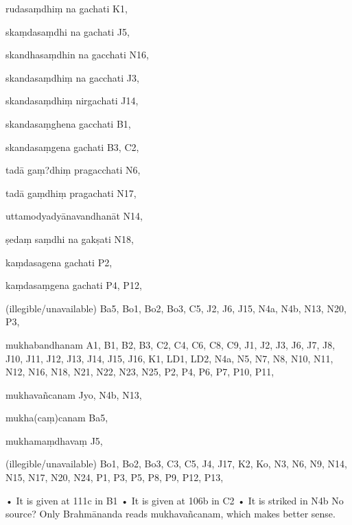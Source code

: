 \begin{marma}[hp03_065]
\item[rudasaṃdhiṃ na gachati] K1,
\item[skaṃdasaṃdhi na gachati] J5,
\item[skandhasaṃdhin na gacchati] N16,
\item[skandasaṃdhiṃ na gacchati] J3,
\item[skandasaṃdhiṃ nirgachati] J14,
\item[skandasaṃghena gacchati] B1,  
\item[skandasaṃgena gachati] B3, C2, 
\item[tadā gaṃ?dhiṃ pragacchati] N6,
\item[tadā gaṃdhiṃ pragachati] N17,
\item[uttamodyadyānavandhanāt] N14,
\item[ṣedaṃ saṃdhi na gakṣati] N18,
\item[kaṃdasagena gachati] P2,
\item[kaṃdasaṃgena gachati] P4, P12, 
\item[(illegible/unavailable)] Ba5, Bo1, Bo2, Bo3, C5, J2, J6, J15, N4a, N4b, N13, N20, P3,

  \begin{description}
  \end{description}

\end{marma}

\begin{marma}[hp03_076]


\item[mukhabandhanam] A1, B1, B2, B3, C2, C4, C6, C8, C9, J1, J2, J3, J6, J7, J8, J10, J11, J12, J13, J14, J15, J16, K1, LD1, LD2, N4a, N5, N7, N8, N10, N11, N12, N16, N18, N21, N22, N23, N25, P2, P4, P6, P7, P10, P11, 
\item[mukhavañcanam] Jyo, N4b, N13, 
\item[mukha(caṃ)canam] Ba5,
\item[mukhamaṃdhavaṃ] J5, 
\item[(illegible/unavailable)] Bo1, Bo2, Bo3, C3, C5, J4, J17, K2, Ko, N3, N6, N9, N14, N15, N17, N20, N24, P1, P3, P5, P8, P9, P12, P13, 

  \begin{description}
    • It is given at 111c in B1 
    • It is given at 106b in C2
    • It is striked in N4b
No source? Only Brahmānanda reads mukhavañcanam, which makes better sense.
  \end{description}

\end{marma}

